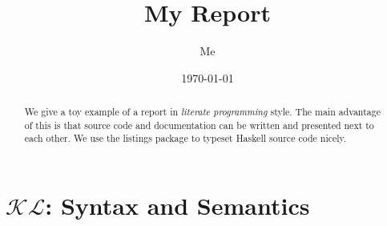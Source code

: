 \documentclass[12pt,a4paper]{article}
\title{My Report}
\author{Me}
\date{\today}
\begin{document}
\maketitle

\begin{abstract}
We give a toy example of a report in \emph{literate programming} style.
The main advantage of this is that source code and documentation can
be written and presented next to each other.
We use the listings package to typeset Haskell source code nicely.
\end{abstract}

\vfill

\tableofcontents

\clearpage


%


\section{$\mathcal{KL}$: Syntax and Semantics}\label{sec:KLmodel}



%




%

%



\end{document}
